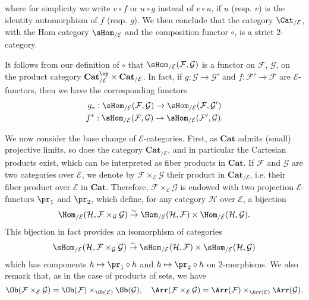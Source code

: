 where for simplicity we write $v\circ f$ or $u\circ g$ instead of $v\circ u$, if $u$ (resp. $v$) is the identity automorphism of $f$ (resp. $g$). We then conclude that the category $\Cat_{/\mathcal{E}}$, with the Hom category $\sHom_{/\mathcal{E}}$ and the composition functor $\circ$, is a strict $2$-category.\par
It follows from our definition of $\circ$ that $\sHom_{/\mathcal{E}}(\mathcal{F},\mathcal{G})$ is a functor on $\mathcal{F}$, $\mathcal{G}$, on the product category $\mathbf{Cat}_{/\mathcal{E}}^{\op}\times\mathbf{Cat}_{/\mathcal{E}}$. In fact, if $g:\mathcal{G}\to \mathcal{G}'$ and $f:\mathcal{F}'\to \mathcal{F}$ are $\mathcal{E}$-functors, then we have the corresponding functors
\begin{gather*}
g_*:\sHom_{/\mathcal{E}}(\mathcal{F},\mathcal{G})\to \sHom_{/\mathcal{E}}(\mathcal{F},\mathcal{G}')\\
f^*:\sHom_{/\mathcal{E}}(\mathcal{F},\mathcal{G})\to \sHom_{/\mathcal{E}}(\mathcal{F}',\mathcal{G}).
\end{gather*}

We now consider the base change of $\mathcal{E}$-categories. First, as $\mathbf{Cat}$ admits (small) projective limits, so does the category $\mathbf{Cat}_{/\mathcal{E}}$, and in particular the Cartesian products exist, which can be interpreted as fiber products in $\mathbf{Cat}$. If $\mathcal{F}$ and $\mathcal{G}$ are two categories over $\mathcal{E}$, we denote by $\mathcal{F}\times_{\mathcal{E}}\mathcal{G}$ their product in $\mathbf{Cat}_{/\mathcal{E}}$, i.e. their fiber product over $\mathcal{E}$ in $\mathbf{Cat}$. Therefore, $\mathcal{F}\times_{\mathcal{E}}\mathcal{G}$ is endowed with two projection $\mathcal{E}$-functors $\pr_1$ and $\pr_2$, which define, for any category $\mathcal{H}$ over $\mathcal{E}$, a bijection
\[\Hom_{/\mathcal{E}}(\mathcal{H},\mathcal{F}\times_\mathcal{G}\mathcal{G})\stackrel{\sim}{\to }\Hom_{/\mathcal{E}}(\mathcal{H},\mathcal{F})\times\Hom_{/\mathcal{E}}(\mathcal{H},\mathcal{G}).\]
This bijection in fact provides an isomorphism of categories
\[\sHom_{/\mathcal{E}}(\mathcal{H},\mathcal{F}\times_\mathcal{G}\mathcal{G})\stackrel{\sim}{\to }\sHom_{/\mathcal{E}}(\mathcal{H},\mathcal{F})\times\sHom_{/\mathcal{E}}(\mathcal{H},\mathcal{G})\]
which has components $h\mapsto\pr_1\circ h$ and $h\mapsto\pr_2\circ h$ on $2$-morphisms. We also remark that, as in the case of products of sets, we have
\[\Ob(\mathcal{F}\times_{\mathcal{E}}\mathcal{G})=\Ob(\mathcal{F})\times_{\Ob(\mathcal{E})}\Ob(\mathcal{G}),\quad \Arr(\mathcal{F}\times_{\mathcal{E}}\mathcal{G})=\Arr(\mathcal{F})\times_{\Arr(\mathcal{E})}\Arr(\mathcal{G}).\]

